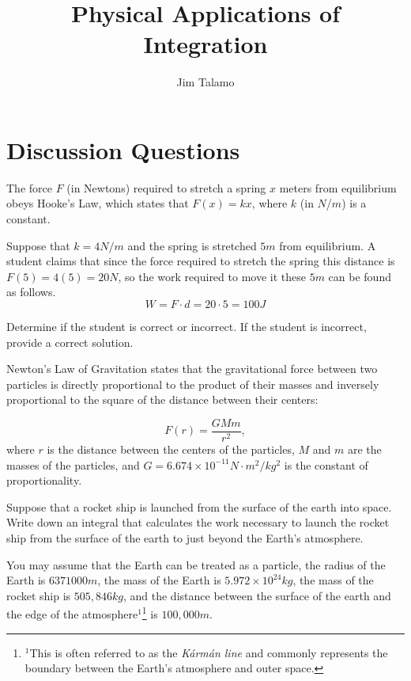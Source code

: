 \documentclass[]{ximera}
\author{Jim Talamo}
\title[]{Physical Applications of Integration}
\begin{document}
\begin{abstract}
\end{abstract}
\maketitle

\vspace{-0.9in}

\section{Discussion Questions}

\begin{problem} The force $F$ (in Newtons) required to stretch a spring $x$ meters from equilibrium obeys Hooke's Law, which states that $F(x) = k x$, where $k$ (in $N$/$m$) is a constant.

Suppose that $k=4 N/m$ and the spring is stretched $5 m$ from equilibrium.  A student claims that since the force required to stretch the spring this distance is $F(5) = 4(5) = 20 N$, so the work required to move it these $5 m$ can be found as follows.
\[
W = F \cdot d = 20 \cdot 5 = 100 J
\]

Determine if the student is correct or incorrect.  If the student is incorrect, provide a correct solution.

\end{problem}

\begin{freeResponse}

\end{freeResponse}

\begin{problem}
Newton's Law of Gravitation states that the gravitational force between two particles is directly proportional to the product of their masses and inversely proportional to the square of the distance between their centers:

\[
F(r) = \frac{GMm}{r^2},
\]
where $r$ is the distance between the centers of the particles, $M$ and $m$ are the masses of the particles, and $G=6.674 \times 10^{-11} \unit{N \cdot m^2 /kg^2}$ is the constant of proportionality.

Suppose that a rocket ship is launched from the surface of the earth into space.  Write down an integral that calculates the work necessary to launch the rocket ship from the surface of the earth to just beyond the Earth's atmosphere.

You may assume that the Earth can be treated as a particle, the radius of the Earth is $6371000 \unit{m}$,  the mass of the Earth is $5.972 \times 10^{24} \unit{kg}$, the mass of the rocket ship is $505,846 \unit{kg}$, and the distance between the surface of the earth and the edge of the atmosphere${^1}$\footnote{$^1$This is often referred to as the \emph{K{\'a}rm{\'a}n line} and commonly represents the boundary between the Earth's atmosphere and outer space.} is $100,000 \unit{m}$.
\end{problem}
\end{document}
